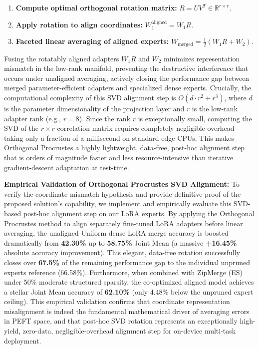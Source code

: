 \begin{enumerate}[leftmargin=*]
\begin{enumerate}[leftmargin=*, label=\alph*.]
        \item \textbf{Compute optimal orthogonal rotation matrix:} $R = U V^T \in \mathbb{R}^{r \times r}$.
        \item \textbf{Apply rotation to align coordinates:} $W_1^{\text{aligned}} = W_1 R$.
        \item \textbf{Faceted linear averaging of aligned experts:} $W_{\text{merged}} = \frac{1}{2}(W_1 R + W_2)$.
    \end{enumerate}
    Fusing the rotatably aligned adapters $W_1 R$ and $W_2$ minimizes representation mismatch in the low-rank manifold, preventing the destructive interference that occurs under unaligned averaging, actively closing the performance gap between merged parameter-efficient adapters and specialized dense experts. Crucially, the computational complexity of this SVD alignment step is $O(d \cdot r^2 + r^3)$, where $d$ is the parameter dimensionality of the projection layer and $r$ is the low-rank adapter rank (e.g., $r=8$). Since the rank $r$ is exceptionally small, computing the SVD of the $r \times r$ correlation matrix requires completely negligible overhead—taking only a fraction of a millisecond on standard edge CPUs. This makes Orthogonal Procrustes a highly lightweight, data-free, post-hoc alignment step that is orders of magnitude faster and less resource-intensive than iterative gradient-descent adaptation at test-time.

    \textbf{Empirical Validation of Orthogonal Procrustes SVD Alignment:} To verify the coordinate-mismatch hypothesis and provide definitive proof of the proposed solution's capability, we implement and empirically evaluate this SVD-based post-hoc alignment step on our LoRA experts. By applying the Orthogonal Procrustes method to align separately fine-tuned LoRA adapters before linear averaging, the unaligned Uniform dense LoRA merge accuracy is boosted dramatically from \textbf{42.30\%} up to \textbf{58.75\%} Joint Mean (a massive \textbf{+16.45\%} absolute accuracy improvement). This elegant, data-free rotation successfully closes over \textbf{67.5\%} of the remaining performance gap to the individual unpruned experts reference (66.58\%). Furthermore, when combined with ZipMerge (ES) under 50\% moderate structured sparsity, the co-optimized aligned model achieves a stellar Joint Mean accuracy of \textbf{62.10\%} (only 4.48\% below the unpruned expert ceiling). This empirical validation confirms that coordinate representation misalignment is indeed the fundamental mathematical driver of averaging errors in PEFT space, and that post-hoc SVD rotation represents an exceptionally high-yield, zero-data, negligible-overhead alignment step for on-device multi-task deployment.


\end{enumerate}
